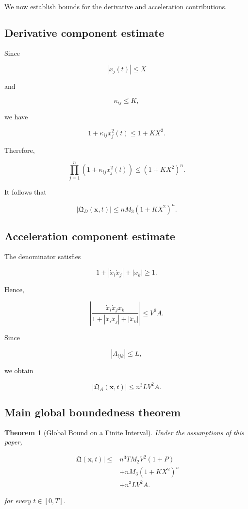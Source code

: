 \documentclass[12pt]{article}
\numberwithin{equation}{section}
\newcommand{\Q}{\mathfrak{Q}}
\newtheorem{theorem}{Theorem}[section]
\theoremstyle{definition}
\theoremstyle{remark}
\begin{document}
We now establish bounds for the derivative
and acceleration contributions.

\subsection{Derivative component estimate}

Since

\[
|x_j(t)|\leq X
\]

and

\[
\kappa_{ij}\leq K,
\]

we have

\[
1+\kappa_{ij}x_j^2(t)
\leq1+KX^2.
\]

Therefore,

\[
\prod_{j=1}^{n}
(1+\kappa_{ij}x_j^2(t))
\leq
(1+KX^2)^n.
\]

It follows that

\[
|\Q_D(\mathbf{x},t)|
\leq
nM_3(1+KX^2)^n.
\]

\subsection{Acceleration component estimate}

The denominator satisfies

\[
1+
|\dot{x}_i\dot{x}_j|
+
|\ddot{x}_k|
\geq1.
\]

Hence,

\[
\left|
\frac{
\dot{x}_i\dot{x}_j\ddot{x}_k
}{
1+
|\dot{x}_i\dot{x}_j|
+
|\ddot{x}_k|
}
\right|
\leq V^2A.
\]

Since

\[
|\Lambda_{ijk}|\leq L,
\]

we obtain

\[
|\Q_A(\mathbf{x},t)|
\leq n^3LV^2A.
\]

\subsection{Main global boundedness theorem}

\begin{theorem}[Global Bound on a Finite Interval]

Under the assumptions of this paper,

\[
\begin{aligned}
|\Q(\mathbf{x},t)|
\leq{}&
n^3TM_2V^2(1+P)
\\
&+
nM_3(1+KX^2)^n
\\
&+
n^3LV^2A.
\end{aligned}
\]

for every \(t\in[0,T]\).

\end{theorem}
\end{document}

